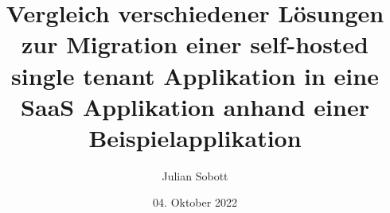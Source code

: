 \documentclass[oneside]{ausarbeitung}
\begin{document}

    \Expose


    \Informatik

    \title{Vergleich verschiedener Lösungen zur Migration einer self-hosted single tenant Applikation in eine SaaS Applikation anhand einer Beispielapplikation}

    \author{Julian Sobott }

   \examinerIsAProfessortrue   %


    \date{04. Oktober 2022}



    \maketitle
    \cleardoublepage


\makeworkplace


    \setcounter{page}{1}
    \cleardoublepage

    

    \appendix
    \printbibliography
\end{document}
